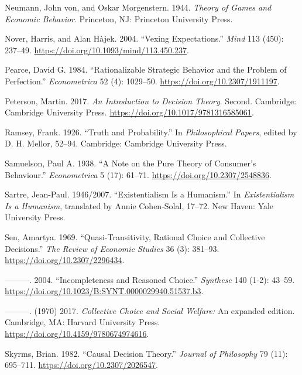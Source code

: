 \documentclass[
  10.5pt,
  twoside]{article}
\newlength{\cslhangindent}
\newenvironment{CSLReferences}[2] %
 {\begin{list}{}{%
  \setlength{\itemindent}{0pt}
  \setlength{\leftmargin}{0pt}
  \setlength{\parsep}{0pt}
  \ifodd #1
   \setlength{\leftmargin}{\cslhangindent}
   \setlength{\itemindent}{-1\cslhangindent}
  \fi
  \setlength{\itemsep}{#2\baselineskip}}}
 {\end{list}}
\begin{document}
\begin{CSLReferences}{1}{0}
Neumann, John von, and Oskar Morgenstern. 1944. \emph{Theory of Games
and Economic Behavior}. Princeton, NJ: Princeton University Press.

Nover, Harris, and Alan Hàjek. 2004. {``Vexing Expectations.''}
\emph{Mind} 113 (450): 237--49.
\url{https://doi.org/10.1093/mind/113.450.237}.

Pearce, David G. 1984. {``Rationalizable Strategic Behavior and the
Problem of Perfection.''} \emph{Econometrica} 52 (4): 1029--50.
\url{https://doi.org/10.2307/1911197}.

Peterson, Martin. 2017. \emph{An Introduction to Decision Theory}.
Second. Cambridge: Cambridge University Press.
\url{https://doi.org/10.1017/9781316585061}.

Ramsey, Frank. 1926. {``Truth and Probability.''} In \emph{Philosophical
Papers}, edited by D. H. Mellor, 52--94. Cambridge: Cambridge University
Press.

Samuelson, Paul A. 1938. {``A Note on the Pure Theory of Consumer's
Behaviour.''} \emph{Econometrica} 5 (17): 61--71.
\url{https://doi.org/10.2307/2548836}.

Sartre, Jean-Paul. 1946/2007. {``Existentialism Is a Humanism.''} In
\emph{Existentialism Is a Humanism}, translated by Annie Cohen-Solal,
17--72. New Haven: Yale University Press.

Sen, Amartya. 1969. {``Quasi-Transitivity, Rational Choice and
Collective Decisions.''} \emph{The Review of Economic Studies} 36 (3):
381--93. \url{https://doi.org/10.2307/2296434}.

---------. 2004. {``Incompleteness and Reasoned Choice.''}
\emph{Synthese} 140 (1-2): 43--59.
\url{https://doi.org/10.1023/B:SYNT.0000029940.51537.b3}.

---------. (1970) 2017. \emph{Collective Choice and Social Welfare:} An
expanded edition. Cambridge, MA: Harvard University Press.
\url{https://doi.org/10.4159/9780674974616}.

Skyrms, Brian. 1982. {``Causal Decision Theory.''} \emph{Journal of
Philosophy} 79 (11): 695--711. \url{https://doi.org/10.2307/2026547}.


\end{CSLReferences}
\end{document}
